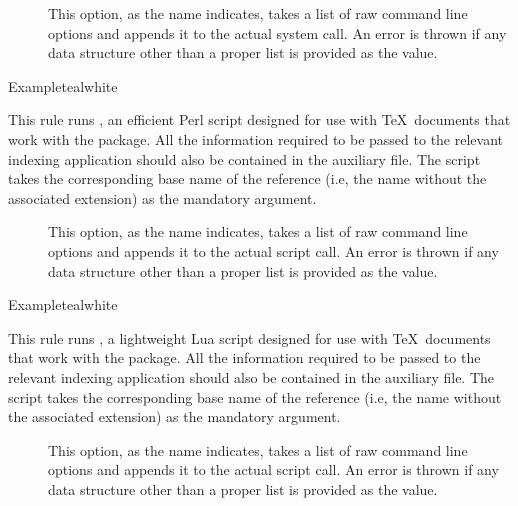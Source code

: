 \begin{description}
\begin{description}
\item[] This option, as the name indicates, takes a list of raw command line options and appends it to the actual system call. An error is thrown if any data structure other than a proper list is provided as the value.
\end{description}

\begin{codebox}{Example}{teal}{\icnote}{white}
\end{codebox}

\item[\rulebox{makeglossaries}{Marco Daniel, Nicola Talbot, Paulo Cereda}] This rule runs , an efficient Perl script designed for use with \TeX\ documents that work with the  package. All the information required to be passed to the relevant indexing application should also be contained in the auxiliary file. The script takes the corresponding base name of the  reference (i.e, the name without the associated extension) as the mandatory argument.

\begin{description}
\item[] This option, as the name indicates, takes a list of raw command line options and appends it to the actual script call. An error is thrown if any data structure other than a proper list is provided as the value.
\end{description}

\begin{codebox}{Example}{teal}{\icnote}{white}
\end{codebox}

\item[\rulebox{makeglossarieslite}{Marco Daniel, Nicola Talbot, Paulo Cereda}] This rule runs , a lightweight Lua script designed for use with \TeX\ documents that work with the  package. All the information required to be passed to the relevant indexing application should also be contained in the auxiliary file. The script takes the corresponding base name of the  reference (i.e, the name without the associated extension) as the mandatory argument.

\begin{description}
\item[] This option, as the name indicates, takes a list of raw command line options and appends it to the actual script call. An error is thrown if any data structure other than a proper list is provided as the value.
\end{description}


\end{description}

